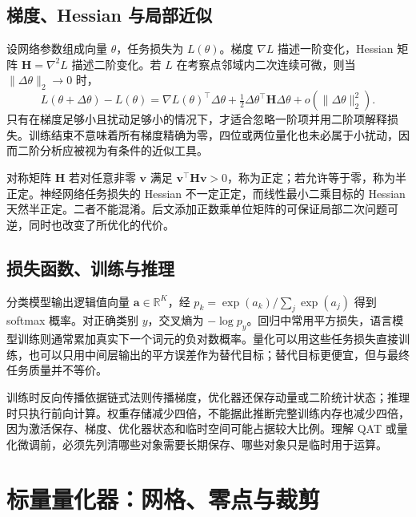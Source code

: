 \documentclass[UTF8,12pt,a4paper,fontset=fandol]{ctexart}
\begin{document}
\subsection{梯度、Hessian 与局部近似}
设网络参数组成向量 $\theta$，任务损失为 $L(\theta)$。梯度 $\nabla L$ 描述一阶变化，Hessian 矩阵 $\mathbf H=\nabla^2L$ 描述二阶变化。若 $L$ 在考察点邻域内二次连续可微，则当 $\|\Delta\theta\|_2\to0$ 时，
\begin{equation}
 L(\theta+\Delta\theta)-L(\theta)
 =\nabla L(\theta)^\top\Delta\theta
 +\tfrac12\Delta\theta^\top\mathbf H\Delta\theta
 +o(\|\Delta\theta\|_2^2).
 \label{eq:quant-taylor}
\end{equation}
只有在梯度足够小且扰动足够小的情况下，才适合忽略一阶项并用二阶项解释损失。训练结束不意味着所有梯度精确为零，四位或两位量化也未必属于小扰动，因而二阶分析应被视为有条件的近似工具。

对称矩阵 $\mathbf H$ 若对任意非零 $\mathbf v$ 满足 $\mathbf v^\top\mathbf H\mathbf v>0$，称为正定；若允许等于零，称为半正定。神经网络任务损失的 Hessian 不一定正定，而线性最小二乘目标的 Hessian 天然半正定。二者不能混淆。后文添加正数乘单位矩阵的可保证局部二次问题可逆，同时也改变了所优化的代价。

\subsection{损失函数、训练与推理}
分类模型输出逻辑值向量 $\mathbf a\in\mathbb R^K$，经 $p_k=\exp(a_k)/\sum_j\exp(a_j)$ 得到 softmax 概率。对正确类别 $y$，交叉熵为 $-\log p_y$。回归中常用平方损失，语言模型训练则通常累加真实下一个词元的负对数概率。量化可以用这些任务损失直接训练，也可以只用中间层输出的平方误差作为替代目标；替代目标更便宜，但与最终任务质量并不等价。

训练时反向传播依据链式法则传播梯度，优化器还保存动量或二阶统计状态；推理时只执行前向计算。权重存储减少四倍，不能据此推断完整训练内存也减少四倍，因为激活保存、梯度、优化器状态和临时空间可能占据较大比例。理解 QAT 或量化微调前，必须先列清哪些对象需要长期保存、哪些对象只是临时用于运算。

\section{标量量化器：网格、零点与裁剪}
\label{sec:quant-scalar}
\end{document}

